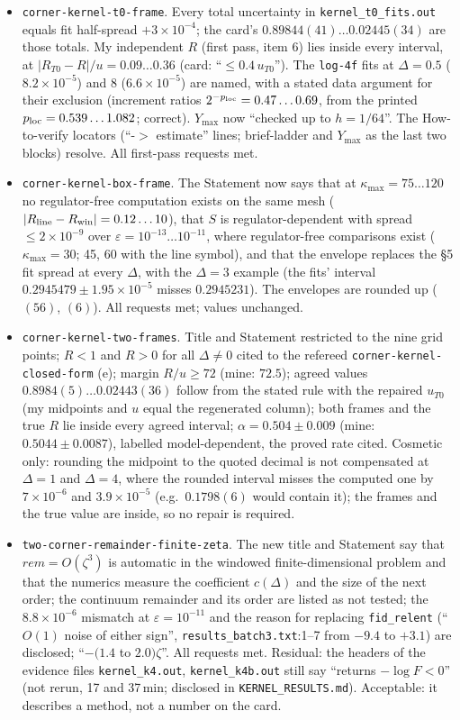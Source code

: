 \documentclass[11pt]{article}
\begin{document}
\begin{itemize}[leftmargin=*]
\item \texttt{corner-kernel-t0-frame}. Every total uncertainty in \texttt{kernel\_t0\_fits.out} equals fit half-spread $+3\times10^{-4}$;
the card's $0.89844(41)\ldots0.02445(34)$ are those totals. My independent $R$ (first pass, item 6) lies inside every
interval, at $|R_{T0}-R|/u=0.09\ldots0.36$ (card: ``$\le0.4\,u_{T0}$''). The \texttt{log-4f} fits at $\Delta=0.5$ ($8.2\times10^{-5}$) and
$8$ ($6.6\times10^{-5}$) are named, with a stated data argument for their exclusion (increment ratios $2^{-p_{\rm loc}}=0.47\ldots0.69$,
from the printed $p_{\rm loc}=0.539\ldots1.082$; correct). $Y_{\max}$ now ``checked up to $h=1/64$''. The How-to-verify locators
(``-$>$ estimate'' lines; brief-ladder and $Y_{\max}$ as the last two blocks) resolve. All first-pass requests met.
\item \texttt{corner-kernel-box-frame}. The Statement now says that at $\kappa_{\max}=75\ldots120$ no regulator-free computation
exists on the same mesh ($|R_{\rm line}-R_{\rm win}|=0.12\ldots10$), that $S$ is regulator-dependent with spread $\le2\times10^{-9}$
over $\varepsilon=10^{-13}\ldots10^{-11}$, where regulator-free comparisons exist ($\kappa_{\max}=30$; 45, 60 with the line symbol),
and that the envelope replaces the \S5 fit spread at every $\Delta$, with the $\Delta=3$ example (the fits' interval
$0.2945479\pm1.95\times10^{-5}$ misses $0.2945231$). The envelopes are rounded up ($(56)$, $(6)$). All requests met; values unchanged.
\item \texttt{corner-kernel-two-frames}. Title and Statement restricted to the nine grid points; $R<1$ and $R>0$ for all
$\Delta\ne0$ cited to the refereed \texttt{corner-kernel-closed-form} (e); margin $R/u\ge72$ (mine: $72.5$); agreed values
$0.8984(5)\ldots0.02443(36)$ follow from the stated rule with the repaired $u_{T0}$ (my midpoints and $u$ equal the regenerated
column); both frames and the true $R$ lie inside every agreed interval; $\alpha=0.504\pm0.009$ (mine: $0.5044\pm0.0087$),
labelled model-dependent, the proved rate cited. Cosmetic only: rounding the midpoint to the quoted decimal is not compensated
at $\Delta=1$ and $\Delta=4$, where the rounded interval misses the computed one by $7\times10^{-6}$ and $3.9\times10^{-5}$
(e.g.\ $0.1798(6)$ would contain it); the frames and the true value are inside, so no repair is required.
\item \texttt{two-corner-remainder-finite-zeta}. The new title and Statement say that $rem=O(\zeta^3)$ is automatic in the
windowed finite-dimensional problem and that the numerics measure the coefficient $c(\Delta)$ and the size of the next order;
the continuum remainder and its order are listed as not tested; the $8.8\times10^{-6}$ mismatch at $\varepsilon=10^{-11}$ and the
reason for replacing \texttt{fid\_relent} (``$O(1)$ noise of either sign'', \texttt{results\_batch3.txt}:1--7 from $-9.4$ to $+3.1$)
are disclosed; ``$-(1.4$ to $2.0)\zeta$''. All requests met. Residual: the headers of the evidence files \texttt{kernel\_k4.out},
\texttt{kernel\_k4b.out} still say ``returns $-\log F<0$'' (not rerun, 17 and 37\,min; disclosed in \texttt{KERNEL\_RESULTS.md}).
Acceptable: it describes a method, not a number on the card.
\end{itemize}
\end{document}
